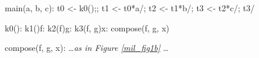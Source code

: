 \begin{minipage}{5in}%
\begin{center}%
\begin{minipage}{4in}%
\begin{AVerb}[numbers=left]
\block main(a, b, c): \label{mil_main_fig2}
  \vbinds t0 <- \goto k0();; \label{mil_t0_fig2}
  \vbinds t1 <- \app t0*a/; \label{mil_t1_fig2}
  \vbinds t2 <- \app t1*b/; \label{mil_t2_fig2}
  \vbinds t3 <- \app t2*c/; \label{mil_t3_fig2}
  \return t3/

\block k0(): \mkclo[k1:] \label{mil_k0_fig2}
\ccblock k1()f: \mkclo[k2:f] \label{mil_k1_fig2}
\ccblock k2(f)g: \mkclo[k3:f, g] \label{mil_k2_fig2}
\ccblock k3(f, g)x: \goto compose(f, g, x) \label{mil_k3_fig2}

\block compose(f, g, x): \dots {\rm\emph{as in Figure \ref{mil_fig1b}}} \dots 
\end{AVerb}
\end{minipage}%
\end{center}%
\end{minipage}%
